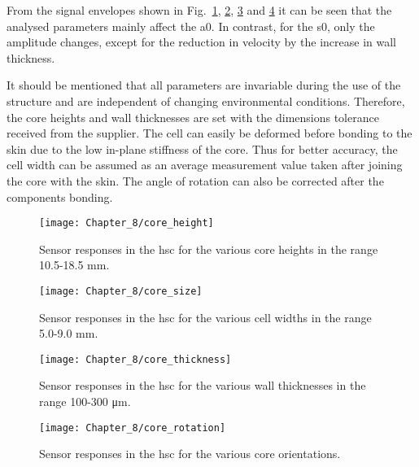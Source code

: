 From the signal envelopes shown in Fig.~\ref{fig:core_height}, \ref{fig:core_size}, \ref{fig:core_thickness} and \ref{fig:core_rotation} it can be seen that the analysed parameters mainly affect the \ac{a0}. 
In contrast, for the \ac{s0}, only the amplitude changes, except for the reduction in velocity by the increase in wall thickness.

It should be mentioned that all parameters are invariable during the use of the structure and are independent of changing environmental conditions.
Therefore, the core heights and wall thicknesses are set with the dimensions tolerance received from the supplier.
The cell can easily be deformed before bonding to the skin due to the low in-plane stiffness of the core.
Thus for better accuracy, the cell width can be assumed as an average measurement value taken after joining the core with the skin.
The angle of rotation can also be corrected after the components bonding.
\begin{figure}[!htb]
	\begin{center}
		\texttt{[image: Chapter\_8/core\_height]}
	\end{center}
	\caption{Sensor responses in the \acf{hsc} for the various core heights in the range 10.5-18.5 \unit{\mm}.}
	\label{fig:core_height}
\end{figure}

\begin{figure}[!htb]
	\begin{center}
		\texttt{[image: Chapter\_8/core\_size]}
	\end{center}
	\caption{Sensor responses in the \acf{hsc} for the various cell widths in the range 5.0-9.0 \unit{\mm}.}
	\label{fig:core_size}
\end{figure}

\begin{figure}[!htb]
	\begin{center}
		\texttt{[image: Chapter\_8/core\_thickness]}
	\end{center}
	\caption{Sensor responses in the \acf{hsc} for the various wall thicknesses in the range 100-300 \unit{\micro\m}.}
	\label{fig:core_thickness}
\end{figure}

\begin{figure}[!htb]
	\begin{center}
		\texttt{[image: Chapter\_8/core\_rotation]}
	\end{center}
	\caption{Sensor responses in the \acf{hsc} for the various core orientations.}
	\label{fig:core_rotation}
\end{figure}
\clearpage
